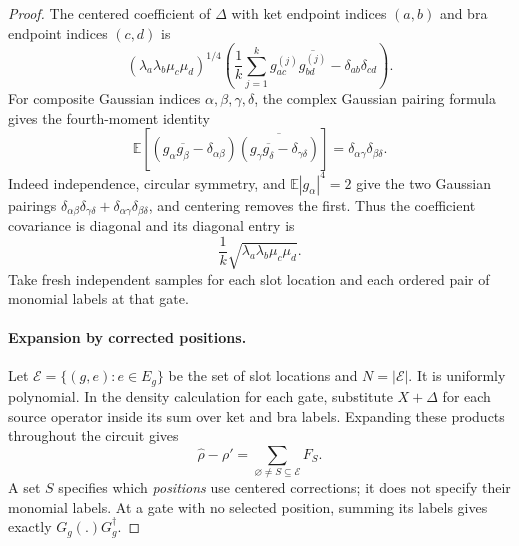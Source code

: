 \begin{proof}
The centered coefficient of $\Delta$ with ket endpoint indices $(a,b)$
and bra endpoint indices $(c,d)$ is
\[
 (\lambda_a\lambda_b\mu_c\mu_d)^{1/4}
 \left(\frac1k\sum_{j=1}^k
          g_{ac}^{(j)}\overline{g_{bd}^{(j)}}
                   -\delta_{ab}\delta_{cd}\right).
\]
For composite Gaussian indices $\alpha,\beta,\gamma,\delta$, the
complex Gaussian pairing formula \cite{Isserlis1918,FassinoPistoneRogantin2019}
gives the fourth-moment identity
\begin{equation}
 \mathbb E\left[
  (g_\alpha\overline{g_\beta}-\delta_{\alpha\beta})
  \overline{(g_\gamma\overline{g_\delta}
                         -\delta_{\gamma\delta})}\right]
       =\delta_{\alpha\gamma}\delta_{\beta\delta}.
 \label{eq:compression-gaussian-covariance}
\end{equation}
Indeed independence, circular symmetry, and $\mathbb E|g_\alpha|^4=2$
give the two Gaussian pairings
$\delta_{\alpha\beta}\delta_{\gamma\delta}
 +\delta_{\alpha\gamma}\delta_{\beta\delta}$, and centering removes
the first.  Thus the coefficient covariance is diagonal and its
diagonal entry is
\begin{equation}
 \frac1k\sqrt{\lambda_a\lambda_b\mu_c\mu_d}.
 \label{eq:compression-slot-variance}
\end{equation}
Take fresh independent samples for each slot location and each ordered
pair of monomial labels at that gate.

\paragraph{Expansion by corrected positions.}
Let $\mathcal E=\{(g,e):e\in E_g\}$ be the set of slot locations and
$N=|\mathcal E|$.  It is uniformly polynomial.  In the density
calculation for each gate, substitute $X+\Delta$ for each source
operator inside its sum over ket and bra labels.  Expanding these
products throughout the circuit gives
\begin{equation}
 \widehat\rho-\rho'
       =\sum_{\varnothing\ne S\subseteq\mathcal E}F_S.
 \label{eq:compression-subset-expansion}
\end{equation}
A set $S$ specifies which \emph{positions} use centered corrections;
it does not specify their monomial labels.  At a gate with no selected
position, summing its labels gives exactly $G_g(.)G_g^\dagger$.


\end{proof}
